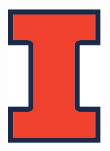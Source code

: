 \begin{titlepage}
    \begin{addmargin}[-1cm]{-3cm}
    \begin{center}
        \large

        \hfill

        \vfill

        \begingroup
            \color{CTtitle}\spacedallcaps{\myTitle} \\ \bigskip
        \endgroup

        \spacedlowsmallcaps{\myName}

        \vfill

        \includegraphics[width=2.5cm]{gfx/BlockI-Logo-Full-Color-RGB.pdf} \\ \medskip

        \myDegree \\
        \bigskip


        \bigskip
        \myLocation \\
        \myTime

        \vfill

    \end{center}
    \myFaculty \\
  \end{addmargin}
\end{titlepage}
